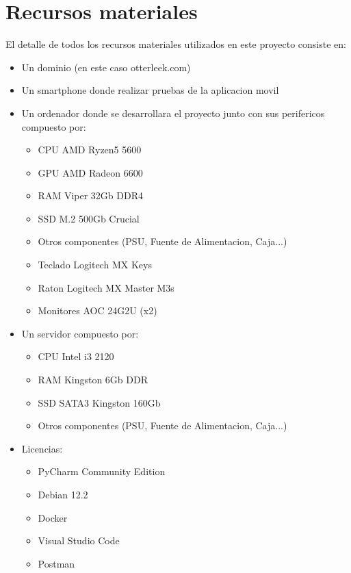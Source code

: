 \documentclass{article}
\begin{document}
\section{Recursos materiales}

\noindent El detalle de todos los recursos materiales utilizados en este proyecto consiste en:
\begin{itemize}
    \item Un dominio (en este caso otterleek.com)
    \item Un smartphone donde realizar pruebas de la aplicacion movil
    \item Un ordenador donde se desarrollara el proyecto junto con sus perifericos compuesto por:
    \begin{itemize}
        \item CPU AMD Ryzen5 5600 
        \item GPU AMD Radeon 6600 
        \item RAM Viper 32Gb DDR4 
        \item SSD M.2 500Gb Crucial
        \item Otros componentes (PSU, Fuente de Alimentacion, Caja...)
        \item Teclado Logitech MX Keys
        \item Raton Logitech MX Master M3s
        \item Monitores AOC 24G2U (x2)
    \end{itemize}
    \item Un servidor compuesto por:
    \begin{itemize}
        \item CPU Intel i3 2120
        \item RAM Kingston 6Gb DDR
        \item SSD SATA3 Kingston 160Gb
        \item Otros componentes (PSU, Fuente de Alimentacion, Caja...)
    \end{itemize}
    \item Licencias:
    \begin{itemize}
        \item PyCharm Community Edition
        \item Debian 12.2
        \item Docker
        \item Visual Studio Code
        \item Postman
    \end{itemize}
\end{itemize}
\end{document}
